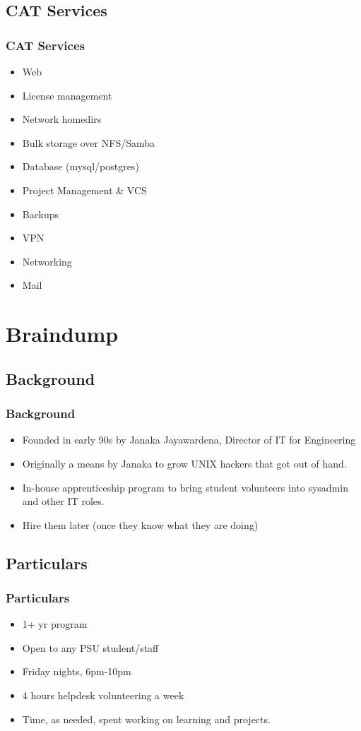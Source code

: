 \documentclass{beamer}
\begin{document}
\subsection{CAT Services}
\frame
{
    \frametitle{CAT Services}
    \begin{itemize}
        \item Web
        \item License management
        \item Network homedirs
        \item Bulk storage over NFS/Samba
        \item Database (mysql/postgres)
        \item Project Management & VCS
        \item Backups
        \item VPN
        \item Networking
        \item Mail
    \end{itemize}

}

\section{Braindump}
\subsection{Background}
\frame
{
    \frametitle{Background}
    \begin{itemize}
        \item Founded in early 90s by Janaka Jayawardena, Director of IT for Engineering
        \item Originally a means by Janaka to grow UNIX hackers that got out of hand.
        \item In-house apprenticeship program to bring student volunteers into sysadmin and other IT roles.
        \item Hire them later (once they know what they are doing)
    \end{itemize}
}

\subsection{Particulars}
\frame
{
    \frametitle{Particulars}
    \begin{itemize}
        \item 1+ yr program
        \item Open to any PSU student/staff
        \item Friday nights, 6pm-10pm
        \item 4 hours helpdesk volunteering a week
        \item Time, as needed, spent working on learning and projects.
    \end{itemize}
}
\end{document}
